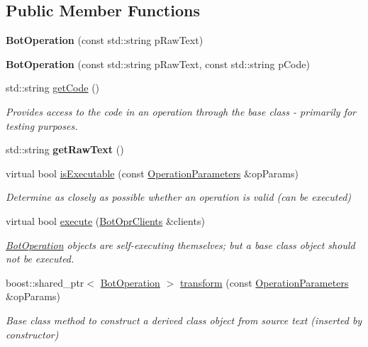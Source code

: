 \subsection*{Public Member Functions}
\begin{DoxyCompactItemize}
\item 
\hypertarget{classBotOperation_a05997cf0f5d8b6d8a0621f6ccfd463ae}{{\bfseries Bot\-Operation} (const std\-::string p\-Raw\-Text)}\label{classBotOperation_a05997cf0f5d8b6d8a0621f6ccfd463ae}

\item 
\hypertarget{classBotOperation_a4acc1fc67e0bbbbda2df061c77b67bfa}{{\bfseries Bot\-Operation} (const std\-::string p\-Raw\-Text, const std\-::string p\-Code)}\label{classBotOperation_a4acc1fc67e0bbbbda2df061c77b67bfa}

\item 
std\-::string \hyperlink{classBotOperation_a768d7dabd43ccbabb72c4ed10dd98ffa}{get\-Code} ()
\begin{DoxyCompactList}\small\item\em Provides access to the code in an operation through the base class -\/ primarily for testing purposes. \end{DoxyCompactList}\item 
\hypertarget{classBotOperation_af178b91062e8844822122599331dfd0b}{std\-::string {\bfseries get\-Raw\-Text} ()}\label{classBotOperation_af178b91062e8844822122599331dfd0b}

\item 
virtual bool \hyperlink{classBotOperation_a0ed080d4c88b9ee0422666de169fb4a6}{is\-Executable} (const \hyperlink{classOperationParameters}{Operation\-Parameters} \&op\-Params)
\begin{DoxyCompactList}\small\item\em Determine as closely as possible whether an operation is valid (can be executed) \end{DoxyCompactList}\item 
virtual bool \hyperlink{classBotOperation_ae1e806e3c0044dc0177e73a7d05711ba}{execute} (\hyperlink{classBotOprClients}{Bot\-Opr\-Clients} \&clients)
\begin{DoxyCompactList}\small\item\em \hyperlink{classBotOperation}{Bot\-Operation} objects are self-\/executing themselves; but a base class object should not be executed. \end{DoxyCompactList}\item 
boost\-::shared\-\_\-ptr$<$ \hyperlink{classBotOperation}{Bot\-Operation} $>$ \hyperlink{classBotOperation_a894e399d0cc8e564831dc4cecd363c09}{transform} (const \hyperlink{classOperationParameters}{Operation\-Parameters} \&op\-Params)
\begin{DoxyCompactList}\small\item\em Base class method to construct a derived class object from source text (inserted by constructor) \end{DoxyCompactList}\end{DoxyCompactItemize}
